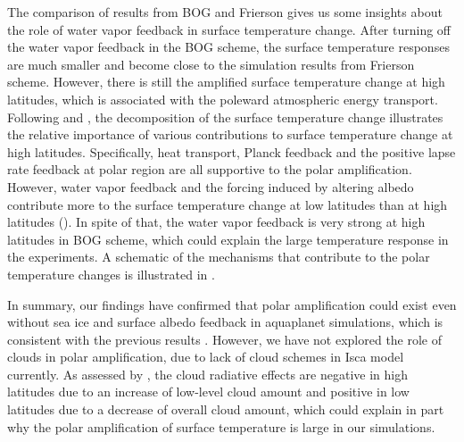 The comparison of results from BOG and Frierson gives us some insights about the role of water vapor feedback in surface temperature change. After turning off the water vapor feedback in the BOG scheme, the surface temperature responses are much smaller and become close to the simulation results from Frierson scheme. However, there is still the amplified surface temperature change at high latitudes, which is associated with the poleward atmospheric energy transport. Following \cite{Feldl2013} and \cite{Kim2018}, the decomposition of the surface temperature change illustrates the relative importance of various contributions to surface temperature change at high latitudes. Specifically, heat transport, Planck feedback and the positive lapse rate feedback at polar region are all supportive to the polar amplification. However, water vapor feedback and the forcing induced by altering albedo contribute more to the surface temperature change at low latitudes than at high latitudes (). In spite of that, the water vapor feedback is very strong at high latitudes in BOG scheme, which could explain the large temperature response in the experiments. A schematic of the mechanisms that contribute to the polar temperature changes is illustrated in .

In summary, our findings have confirmed that polar amplification could exist even without sea ice and surface albedo feedback in aquaplanet simulations, which is consistent with the previous results \citep{Langen2007,Kim2018,Alexeev2005}. However, we have not explored the role of clouds in polar amplification, due to lack of cloud schemes in Isca model currently. As assessed by \cite{Kim2018}, the cloud radiative effects are negative in high latitudes due to an increase of low-level cloud amount and positive in low latitudes due to a decrease of overall cloud amount, which could explain in part why the polar amplification of surface temperature is large in our simulations. 


